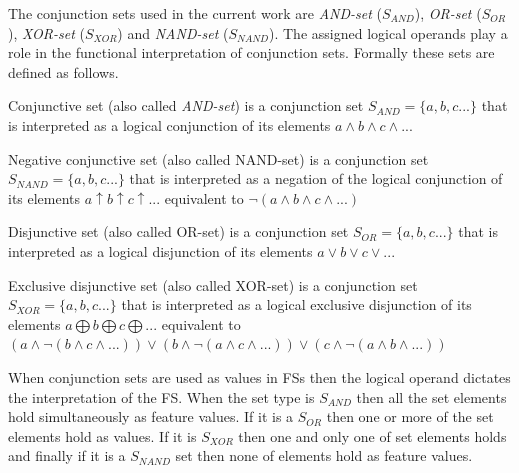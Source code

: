     The conjunction sets used in the current work are \textit{AND-set} ($S_{AND}$), \textit{OR-set} ($S_{OR}$), \textit{XOR-set} ($S_{XOR}$) and \textit{NAND-set} ($S_{NAND}$). The assigned logical operands play a role in the functional interpretation of conjunction sets. %
    Formally these sets are defined as follows.

    \begin{definition}\label{def:and-set}
      Conjunctive set (also called \textit{AND-set}) is a conjunction set $S_{AND}=\{a,b,c...\}$ that is interpreted as a logical conjunction of its elements $a \wedge b \wedge c \wedge ...$ 
    \end{definition}

    \begin{definition}\label{def:nand-set}
    	Negative conjunctive set (also called NAND-set) is a conjunction set $S_{NAND}=\{a,b,c...\}$ that is interpreted as a negation of the logical conjunction of its elements $a \uparrow b \uparrow c \uparrow ...$ equivalent to $ \neg(a \wedge b \wedge c \wedge ...)$ 
    \end{definition}

    \begin{definition}\label{def:or-set}
    	Disjunctive set (also called OR-set) is a conjunction set $S_{OR}=\{a,b,c...\}$ that is interpreted as a logical disjunction of its elements $a \vee b \vee c \vee ...$
    \end{definition}

    \begin{definition}\label{def:xor-set}
    	Exclusive disjunctive set (also called XOR-set) is a conjunction set $S_{XOR}=\{a,b,c...\}$ that is interpreted as a logical exclusive disjunction of its elements $a \bigoplus b \bigoplus c \bigoplus ...$ equivalent to $ (a \wedge \neg (b \wedge c \wedge ... )) \vee (b \wedge \neg (a \wedge c \wedge ...)) \vee (c \wedge \neg (a \wedge b \wedge ...)) $
    \end{definition}

    When conjunction sets are used as values in FSs then the logical operand dictates the interpretation of the FS. When the set type is $S_{AND}$ then all the set elements hold simultaneously as feature values. If it is a $S_{OR}$ then one or more of the set elements hold as values. If it is $S_{XOR}$ then one and only one of set elements holds and finally if it is a $S_{NAND}$ set then none of elements hold as feature values.

